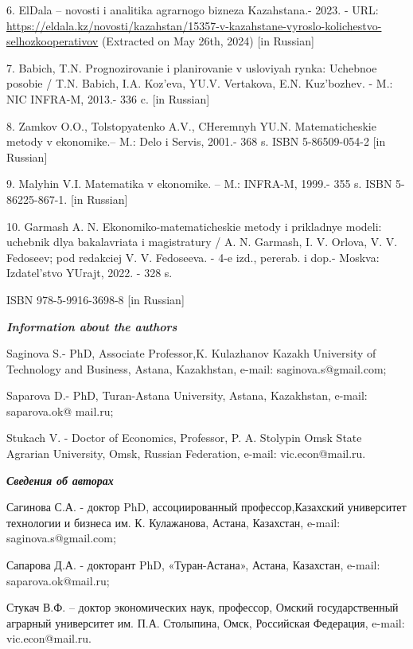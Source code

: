 6. ElDala -- novosti i analitika agrarnogo bizneza Kazahstana.- 2023. -
URL:
\url{https://eldala.kz/novosti/kazahstan/15357-v-kazahstane-vyroslo-kolichestvo-selhozkooperativov}
(Extracted on May 26th, 2024) {[}in Russian{]}

7. Babich, T.N. Prognozirovanie i planirovanie v usloviyah rynka:
Uchebnoe posobie / T.N. Babich, I.A. Koz'eva, YU.V. Vertakova, E.N.
Kuz'bozhev. - M.: NIC INFRA-M, 2013.- 336 c. {[}in Russian{]}

8. Zamkov O.O., Tolstopyatenko A.V., CHeremnyh YU.N. Matematicheskie
metody v ekonomike.-- M.: Delo i Servis, 2001.- 368 s. ISBN
5-86509-054-2 {[}in Russian{]}

9. Malyhin V.I. Matematika v ekonomike. -- M.: INFRA-M, 1999.- 355 s.
ISBN 5-86225-867-1. {[}in Russian{]}

10. Garmash A. N. Ekonomiko-matematicheskie metody i prikladnye modeli:
uchebnik dlya bakalavriata i magistratury / A. N. Garmash, I. V. Orlova,
V. V. Fedoseev; pod redakciej V. V. Fedoseeva. - 4-e izd., pererab. i
dop.- Moskva: Izdatel'stvo YUrajt, 2022. - 328 s.

ISBN 978-5-9916-3698-8 {[}in Russian{]}

\emph{{\bfseries Information about the authors}}

Saginova S.- PhD, Associate Professor,K. Kulazhanov Kazakh University of
Technology and Business, Astana, Kazakhstan, e-mail:
saginova.s@gmail.com;

Saparova D.- PhD, Turan-Astana University, Astana, Kazakhstan, e-mail:
saparova.ok@ mail.ru;

Stukach V. - Doctor of Economics, Professor, P. A. Stolypin Omsk State
Agrarian University, Omsk, Russian Federation, e-mail: vic.econ@mail.ru.

\emph{{\bfseries Сведения об авторах}}

Сагинова С.А. - доктор PhD, ассоциированный профессор,Казахский
университет технологии и бизнеса им. К. Кулажанова, Астана, Казахстан,
e-mail: saginova.s@gmail.com;

Сапарова Д.А. - докторант PhD, «Туран-Астана», Астана, Казахстан,
e-mail: saparova.ok@mail.ru;

Стукач В.Ф. -- доктор экономических наук, профессор, Омский
государственный аграрный университет им. П.А. Столыпина, Омск,
Российская Федерация, e-mail: vic.econ@mail.ru.
